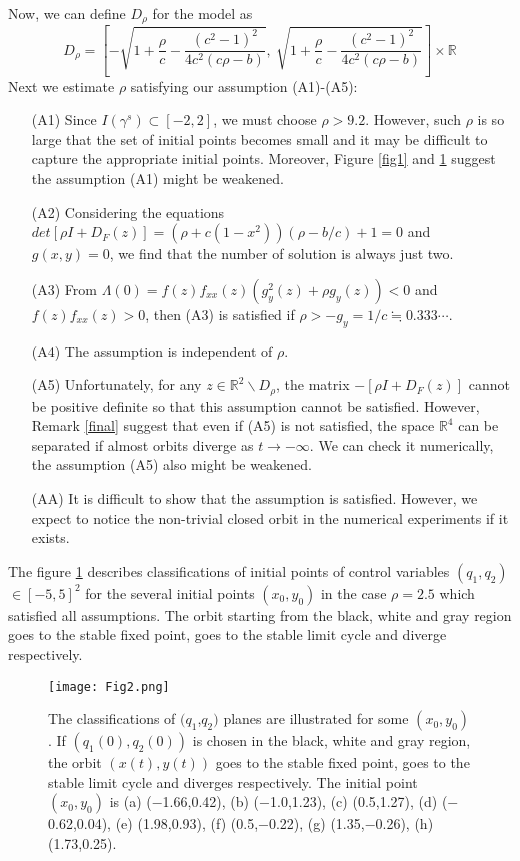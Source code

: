 \documentclass[11pt,reqno]{amsart}
\begin{document}
Now, we can define $D_\rho$ for the model as
$$
D_\rho=\left[-\sqrt{1+\frac{\rho}{c}-\frac{(c^2-1)^2}{4c^2(c\rho-b)}},\ \sqrt{1+\frac{\rho}{c}-\frac{(c^2-1)^2}{4c^2(c\rho-b)}}\right]\times \mathbb{R}
$$
Next we estimate $\rho$ satisfying our assumption (A1)-(A5):

\begin{itemize}
\item[(A1)] Since $I(\gamma^s)\subset[-2,2]$, we must choose $\rho>9.2$. However, such $\rho$ is so large that the set of initial points becomes small and it may be difficult to capture the appropriate initial points. Moreover, Figure \ref{fig1} and \ref{fig2} suggest the assumption (A1) might be weakened.
\item[(A2)] Considering the equations $det[\rho I+D_F(z)]=(\rho+c(1-x^2))(\rho-b/c)+1=0$ and $g(x,y)=0$, we find that the number of solution is always just two.
\item[(A3)] From $\Lambda(0)=f(z)f_{xx}(z)(g_y^2(z)+\rho g_y(z)) < 0$ and $f(z)f_{xx}(z) > 0$, then (A3) is satisfied if $\rho>-g_y=1/c\fallingdotseq 0.333\cdots$.
\item[(A4)] The assumption is independent of $\rho$.
\item[(A5)] Unfortunately, for any $z\in\mathbb{R}^2\backslash D_\rho$, the matrix $-[\rho I +D_F(z)]$ cannot be positive definite so that this assumption cannot be satisfied. However, Remark \ref{final} suggest that even if (A5) is not satisfied, the space $\mathbb{R}^4$ can be separated if almost orbits diverge as $t\to-\infty$. We can check it numerically, the assumption (A5) also might be weakened.
\item[(AA)] It is difficult to show that the assumption is satisfied. However, we expect to notice the non-trivial closed orbit in the numerical experiments if it exists. 
\end{itemize}

The figure \ref{fig2} describes classifications of initial points of control variables $(q_1,q_2)$ $\in[-5,5]^2$ for the several initial points $(x_0,y_0)$ in the case $\rho=2.5$ which satisfied all assumptions. The orbit starting from the black, white and gray region goes to the stable fixed point, goes to the stable limit cycle and diverge respectively.

\begin{figure}[htp]
\begin{center}
\texttt{[image: Fig2.png]}
\caption{The classifications of $(q_1$,$q_2)$ planes are illustrated for some $(x_0,y_0)$. If $(q_1(0),q_2(0))$ is chosen in the black, white and gray region, the orbit $(x(t),y(t))$ goes to the stable fixed point, goes to the stable limit cycle and diverges respectively. The initial point $(x_0,y_0)$ is (a)  ($-$1.66,0.42), (b) ($-$1.0,1.23), (c) (0.5,1.27), (d) ($-$0.62,0.04), (e) (1.98,0.93), (f) (0.5,$-$0.22), (g) (1.35,$-$0.26), (h)  (1.73,0.25).}
\label{fig2}
\end{center}
\end{figure}
\end{document}
